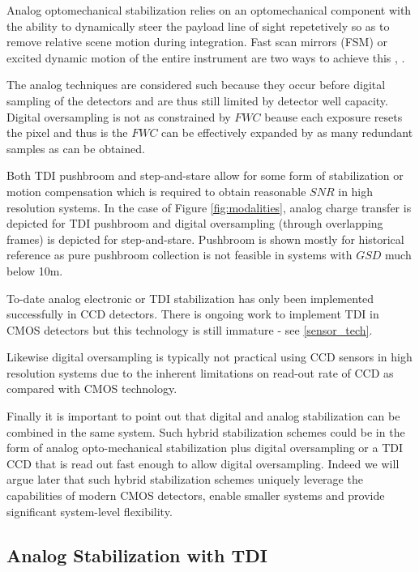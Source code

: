 \documentclass[10pt,journal]{IEEEtran}  %
\begin{document}
{Analog optomechanical stabilization relies on an optomechanical component with the ability to dynamically steer the payload line of sight repetetively so as to remove relative scene motion during integration.  Fast scan mirrors (FSM) or excited dynamic motion of the entire instrument are two ways to achieve this \cite{patent:jonny}, \cite{patent:dirk}.

The analog techniques are considered such because they occur before digital sampling of the detectors and are thus still limited by detector well capacity.  Digital oversampling is not as constrained by $FWC$ beause each exposure resets the pixel and thus is the $FWC$ can be effectively expanded by as many redundant samples as can be obtained.

Both TDI pushbroom and step-and-stare allow for some form of stabilization or motion compensation which is required to obtain reasonable $SNR$ in high resolution systems.  In the case of Figure \ref{fig:modalities}, analog charge transfer is depicted for TDI pushbroom and digital oversampling (through overlapping frames) is depicted for step-and-stare.  Pushbroom is shown mostly for historical reference as pure pushbroom collection is not feasible in systems with $GSD$ much below 10m.

To-date analog electronic or TDI stabilization has only been implemented successfully in CCD detectors.  There is ongoing work to implement TDI in CMOS detectors but this technology is still immature - see \ref{sensor_tech}.  

Likewise digital oversampling is typically not practical using CCD sensors in high resolution systems due to the inherent limitations on read-out rate of CCD as compared with CMOS technology.

Finally it is important to point out that digital and analog stabilization can be combined in the same system.  Such hybrid stabilization schemes could be in the form of analog opto-mechanical stabilization plus digital oversampling or a TDI CCD that is read out fast enough to allow digital oversampling.  Indeed we will argue later that such hybrid stabilization schemes uniquely leverage the capabilities of modern CMOS detectors, enable smaller systems and provide significant system-level flexibility.

\subsection{Analog Stabilization with TDI}

}
\end{document}
